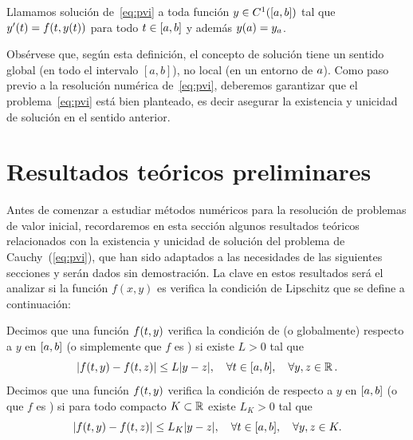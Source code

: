 \begin{definition}
  Llamamos solución de~\eqref{eq:pvi} a toda función $\sol\in
  C^1([\ta,\tb])$ tal que $\sol'(\tt)=f(\tt,\sol(\tt))$ para todo
  $\tt\in[\ta,\tb]$ y además $\sol(\ta)=\ycero$.\label{def:3}
\end{definition}

Obsérvese que, según esta definición, el
concepto de solución tiene un sentido global (en todo el intervalo
$[a,b]$), no local (en un entorno de $\ta$).
Como paso previo a la resolución numérica de~\eqref{eq:pvi}, deberemos
garantizar que el problema~\eqref{eq:pvi} está bien planteado, es
decir asegurar la existencia y unicidad de solución en el sentido
anterior. 

\section{Resultados teóricos preliminares}
\label{sec:tema4:resultados-teoricos}

Antes de comenzar a estudiar métodos numéricos para la resolución de
problemas de valor inicial, recordaremos en esta sección algunos
resultados teóricos relacionados con la existencia y unicidad de
solución del problema de Cauchy~(\ref{eq:pvi}), que han sido adaptados
a las necesidades de las siguientes secciones y serán dados sin
demostración. La clave en estos resultados será el analizar si la
función $f(x,y)$ es verifica la condición de Lipschitz que se define a
continuación:

\begin{definition}
  \label{def:lipschitz}
  Decimos que una función $f(\tt,y)$ verifica la condición de
   (o globalmente) respecto a $y$ en
    $[\ta,\tb]$ (o simplemente que $f$ es \globLipschitz)
    si existe $L>0$ tal que
  \begin{equation*}
    |f(\tt,y) - f(\tt,z)| \le L |y-z|, \quad \forall \tt\in [\ta,\tb],
    \quad  \forall y,z\in \Rset.
  \end{equation*}
  Decimos que una función $f(\tt,y)$ verifica la condición de
   respecto a $y$ en
  $[\ta,\tb]$ (o que $f$ es \locLipschitz) si para todo compacto
  $K\subset\Rset$ existe $L_K>0$ tal que
  \begin{equation*}
    |f(\tt,y) - f(\tt,z)| \le L_K |y-z|, \quad \forall \tt\in [\ta,\tb],
    \quad  \forall y,z\in K.
  \end{equation*}
\end{definition}

